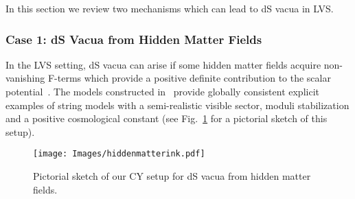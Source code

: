 \documentclass[12pt,a4paper]{book}
\begin{document}
In this section we review two mechanisms which can lead to dS vacua in LVS.

\subsubsection{Case 1: dS Vacua from Hidden Matter Fields}
\label{sssec:MatterUplift}

In the LVS setting, dS vacua can arise if some hidden matter fields acquire non-vanishing F-terms which provide a positive definite contribution to the scalar potential~\cite{Cicoli:2012vw}. The models constructed in~\cite{Cicoli:2012vw} provide globally consistent explicit examples of string models with a semi-realistic visible sector, moduli stabilization and a positive cosmological constant (see Fig.~\ref{Fig1} for a pictorial sketch of this setup).\\

\begin{figure}[t]
\begin{center}
\texttt{[image: Images/hiddenmatterink.pdf]}
\caption{Pictorial sketch of our CY setup for dS vacua from hidden matter fields.} \label{Fig1}
\end{center}
\end{figure}
\end{document}
